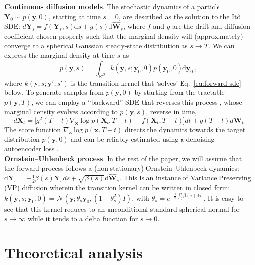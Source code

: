 \documentclass{article}
\newcommand{\vect}[1]{\boldsymbol{#1}}
\begin{document}
\textbf{Continuous diffusion models}.
The stochastic dynamics of a particle $\mathbf{Y}_0 \sim p(\mathbf{y}, 0)$, starting at time $s=0$, are described as the solution to the Itô SDE: 
$
d \mathbf{Y}_s = f(\mathbf{Y}_s, s) \text{d}s +g(s)\text{d}\mathbf{\hat{W}}_s
\label{eq:forward sde}
$,
where $f$ and $g$ are the drift and diffusion coefficient chosen properly such that the marginal density will (approximately) converge to a spherical Gaussian steady-state distribution as $s\to  T$. We can express the marginal density at time $s$ as 
\begin{equation} \label{eq: marginals}
    p(\vect{y}, s) = \int_{\mathbb{R}^D} k(\vect{y}, s; \vect{y}_0, 0) p(\vect{y}_0, 0) \text{d} \vect{y}_0~,
\end{equation}
where $k(\vect{y}, s; \vect{y}', s')$ is the transition kernel that `solves' Eq.~\ref{eq:forward sde} below. To generate samples from $p(\vect{y}, 0)$ by starting from the tractable $p(\vect{y}, T)$, we can employ a ``backward'' SDE that reverses this process \citep{anderson1982reverse}, whose marginal density evolves according to $p(\vect{y},s)$, reverse in time,
\begin{equation} \label{eq: generative sde}
d \mathbf{X}_t = \Big[ g^2(T - t) \nabla_{\vect{x}} \log p(\mathbf{X}_t, T-t) - f(\mathbf{X}_t, T-t)\Big]dt +g(T-t)d\mathbf{W}_t
\end{equation}
The score function $\nabla_{\vect{x}} \log p(\vect{x}, T-t)$ directs the dynamics towards the target distribution $p(\vect{y}, 0)$ and can be reliably estimated using a denoising autoencoder loss \citep{vincent2011connection, song2021scorebased}. \\ \textbf{Ornstein–Uhlenbeck process}. In the rest of the paper, we will assume that the forward process follows a (non-stationary) Ornstein–Uhlenbeck dynamics:
$
    \text{d} \mathbf{Y}_s = - \frac{1}{2} \beta(s) \mathbf{Y}_s ds + \sqrt{\beta(s)} \text{d}\mathbf{\hat{W}}_s
    \label{eq:ou}
$.
This is an instance of Variance Preserving (VP) diffusion
\citep{song2021scorebased} wherein  the  transition kernel can be written in closed form:
$
    k(\vect{y}, s; \vect{y}_0, 0) = \mathcal{N}\left(\vect{y}; \theta_{s} \vect{y}_0, (1 - \theta_{s}^2) I \right)
$,
with
$
    \theta_s = e^{-\frac{1}{2} \int_0^s \beta(\tau) \text{d} \tau}~.
$
It is easy to see that this kernel reduces to an unconditional standard spherical normal for $s \rightarrow \infty$ while it tends to a delta function for $s \rightarrow 0$. 

\section{Theoretical analysis}
\label{sec:theoretical_analysis}
\end{document}

